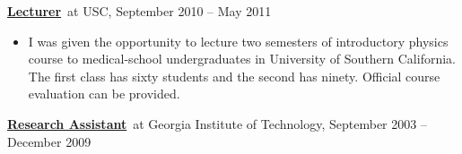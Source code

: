 \documentclass{sebase}
\begin{document}
\begin{description}
\item \quad \underline{\textbf{Lecturer}}{\normalsize \ at USC, September
2010 -- May 2011}
\end{description}

\begin{itemize}
\item I was given the opportunity to lecture two semesters of introductory
physics course to medical-school undergraduates in University of Southern
California. The first class has sixty students and the second has ninety.
Official course evaluation can be provided.
\end{itemize}

\begin{description}
\item \quad \underline{\textbf{Research Assistant}}{\normalsize \ at Georgia
Institute of Technology, September 2003 -- December 2009}
\end{description}
\end{document}
